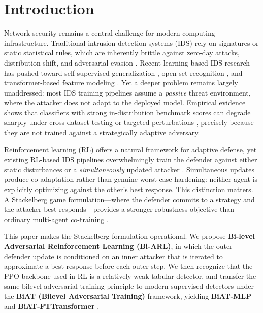 \section{Introduction}
\label{sec:introduction}

Network security remains a central challenge for modern computing infrastructure. Traditional intrusion detection systems (IDS) rely on signatures or static statistical rules, which are inherently brittle against zero-day attacks, distribution shift, and adversarial evasion \cite{liao2024survey, moustafa2023explainable, wang2023robustnessnids}. Recent learning-based IDS research has pushed toward self-supervised generalization \cite{golchin2024ssclids, xu2024gnnssl}, open-set recognition \cite{qiu2024vaemax}, and transformer-based feature modeling \cite{xi2024idsmtran, xin2025crossdatasettransformer}. Yet a deeper problem remains largely unaddressed: most IDS training pipelines assume a \emph{passive} threat environment, where the attacker does not adapt to the deployed model. Empirical evidence shows that classifiers with strong in-distribution benchmark scores can degrade sharply under cross-dataset testing or targeted perturbations \cite{cantone2024crossdataset, wang2023robustnessnids}, precisely because they are not trained against a strategically adaptive adversary.

Reinforcement learning (RL) offers a natural framework for adaptive defense, yet existing RL-based IDS pipelines overwhelmingly train the defender against either static disturbances or a \emph{simultaneously} updated attacker \cite{malialis2015multiagent, anderson2016rl_security}. Simultaneous updates produce co-adaptation rather than genuine worst-case hardening: neither agent is explicitly optimizing against the other's best response. This distinction matters. A Stackelberg game formulation---where the defender commits to a strategy and the attacker best-responds---provides a stronger robustness objective than ordinary multi-agent co-training \cite{vonStackelberg1952, colson2007bilevel, pinto2017robust_rl}.

This paper makes the Stackelberg formulation operational. We propose \textbf{Bi-level Adversarial Reinforcement Learning (Bi-ARL)}, in which the outer defender update is conditioned on an inner attacker that is iterated to approximate a best response before each outer step. We then recognize that the PPO backbone used in RL is a relatively weak tabular detector, and transfer the same bilevel adversarial training principle to modern supervised detectors under the \textbf{BiAT (Bilevel Adversarial Training)} framework, yielding \textbf{BiAT-MLP} and \textbf{BiAT-FTTransformer} \cite{gorishniy2021fttransformer}.

